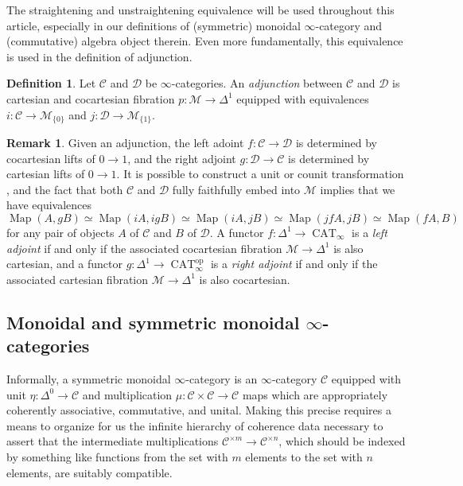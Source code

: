 \documentclass{article}
\theoremstyle{definition}
\newtheorem{definition}{Definition}[subsection]
\newtheorem{remark}{Remark}[subsection]
\newcommand{\C}{\mathcal{C}}
\newcommand{\D}{\mathcal{D}}
\newcommand{\M}{\mathcal{M}}
\renewcommand{\i}{\infty}
\newcommand{\op}{\mathrm{op}}
\DeclareMathOperator{\CAT}{CAT}
\DeclareMathOperator{\Map}{Map}
\begin{document}
The straightening and unstraightening equivalence will be used throughout this article, especially in our definitions of (symmetric) monoidal $\infty$-category and (commutative) algebra object therein.
Even more fundamentally, this equivalence is used in the definition of adjunction.

\begin{definition}
Let $\C$ and $\D$ be $\i$-categories.
An {\em adjunction} between $\C$ and $\D$ is cartesian and cocartesian fibration $p:\M\to\Delta^1$ equipped with equivalences $i:\C\to\M_{\{0\}}$ and $j:\D\to\M_{\{1\}}$.
\end{definition}
\begin{remark}
Given an adjunction, the left adoint $f:\C\to\D$ is determined by cocartesian lifts of $0\to 1$, and the right adjoint $g:\D\to\C$ is determined by cartesian lifts of $0\to 1$.
It is possible to construct a unit or counit transformation \cite[Proposition 5.2.2.8]{HTT}, and the fact that both $\C$ and $\D$ fully faithfully embed into $\M$ implies that we have equivalences
\[
\Map(A,gB)\simeq\Map(iA,igB)\simeq\Map(iA,jB)\simeq\Map(jfA,jB)\simeq\Map(fA,B)
\]
for any pair of objects $A$ of $\C$ and $B$ of $\D$.
A functor $f:\Delta^1\to\CAT_\i$ is a {\em left adjoint} if and only if the associated cocartesian fibration $\M\to\Delta^1$ is also cartesian, and a functor $g:\Delta^{1}\to\CAT_\i^{\op}$ is a {\em right adjoint} if and only if the associated cartesian fibration $\M\to\Delta^1$ is also cocartesian.
\end{remark}
\subsection{Monoidal and symmetric monoidal $\infty$-categories}

Informally, a symmetric monoidal $\infty$-category is an $\infty$-category $\C$ equipped with unit $\eta:\Delta^0\to\C$ and multiplication $\mu:\C\times\C\to\C$ maps which are appropriately coherently associative, commutative, and unital.
Making this precise requires a means to organize for us the infinite hierarchy of coherence data necessary to assert that the intermediate multiplications $\C^{\times m}\to\C^{\times n}$, which should be indexed by something like functions from the set with $m$ elements to the set with $n$ elements, are suitably compatible.
\end{document}
